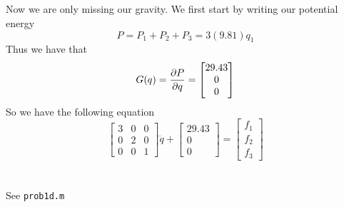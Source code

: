 \documentclass{../homework}
\begin{document}
\begin{parts}[n]
\begin{parts}
\begin{parts}[r]
               \part{} Now we are only missing our gravity. We first start by writing our potential energy
               \[
                   P = P_1 + P_2 + P_3 = 3(9.81)q_1
               \]
               Thus we have that
               \[
                   G(q) = \pdv{P}{q} = \begin{bmatrix}
                       29.43 \\
                       0 \\
                       0
                   \end{bmatrix}
               \]
               So we have the following equation
               \[
                   \begin{bmatrix}
                       3 & 0 & 0 \\
                       0 & 2 & 0 \\
                       0 & 0 & 1
                   \end{bmatrix}\ddot{q} + \begin{bmatrix}
                       29.43 \\
                       0 \\
                       0
                   \end{bmatrix}
                   =
                   \begin{bmatrix}
                       f_1 \\
                       f_2 \\
                       f_3
                   \end{bmatrix}
               \]
           \end{parts}
           \part{} See \texttt{prob1d.m}
       \end{parts}


\end{parts}
\end{document}
